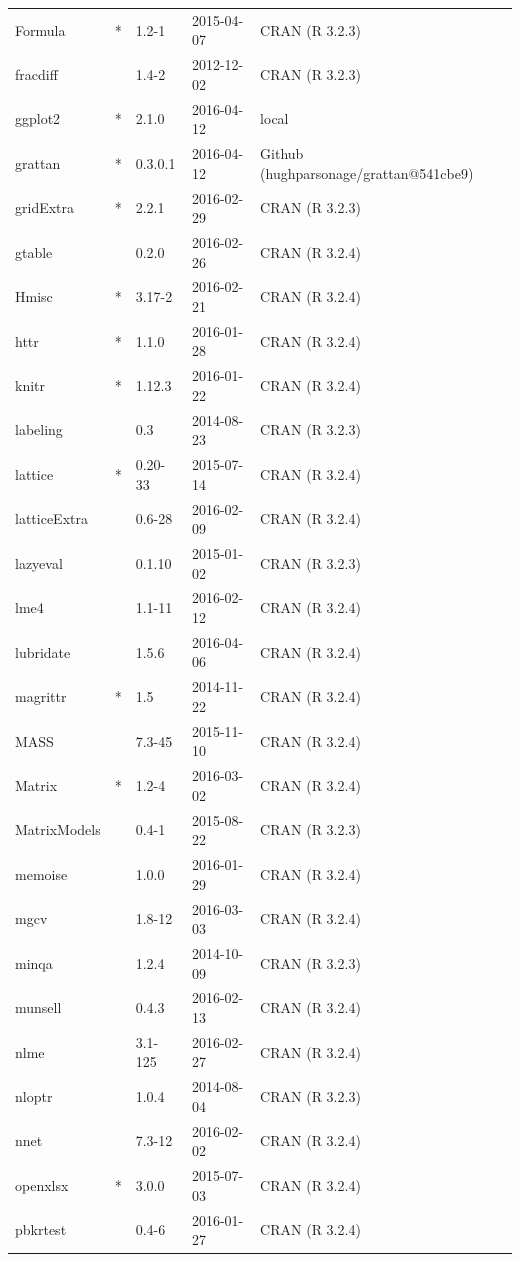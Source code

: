 \documentclass{grattan}\usepackage[]{graphicx}\usepackage[]{color}
\begin{document}
\begin{longtable}{lllll}
  Formula & * & 1.2-1 & 2015-04-07 & CRAN (R 3.2.3) \\ 
  fracdiff &  & 1.4-2 & 2012-12-02 & CRAN (R 3.2.3) \\ 
  ggplot2 & * & 2.1.0 & 2016-04-12 & local \\ 
  grattan & * & 0.3.0.1 & 2016-04-12 & Github (hughparsonage/grattan@541cbe9) \\ 
  gridExtra & * & 2.2.1 & 2016-02-29 & CRAN (R 3.2.3) \\ 
  gtable &  & 0.2.0 & 2016-02-26 & CRAN (R 3.2.4) \\ 
  Hmisc & * & 3.17-2 & 2016-02-21 & CRAN (R 3.2.4) \\ 
  httr & * & 1.1.0 & 2016-01-28 & CRAN (R 3.2.4) \\ 
  knitr & * & 1.12.3 & 2016-01-22 & CRAN (R 3.2.4) \\ 
  labeling &  & 0.3 & 2014-08-23 & CRAN (R 3.2.3) \\ 
  lattice & * & 0.20-33 & 2015-07-14 & CRAN (R 3.2.4) \\ 
  latticeExtra &  & 0.6-28 & 2016-02-09 & CRAN (R 3.2.4) \\ 
  lazyeval &  & 0.1.10 & 2015-01-02 & CRAN (R 3.2.3) \\ 
  lme4 &  & 1.1-11 & 2016-02-12 & CRAN (R 3.2.4) \\ 
  lubridate &  & 1.5.6 & 2016-04-06 & CRAN (R 3.2.4) \\ 
  magrittr & * & 1.5 & 2014-11-22 & CRAN (R 3.2.4) \\ 
  MASS &  & 7.3-45 & 2015-11-10 & CRAN (R 3.2.4) \\ 
  Matrix & * & 1.2-4 & 2016-03-02 & CRAN (R 3.2.4) \\ 
  MatrixModels &  & 0.4-1 & 2015-08-22 & CRAN (R 3.2.3) \\ 
  memoise &  & 1.0.0 & 2016-01-29 & CRAN (R 3.2.4) \\ 
  mgcv &  & 1.8-12 & 2016-03-03 & CRAN (R 3.2.4) \\ 
  minqa &  & 1.2.4 & 2014-10-09 & CRAN (R 3.2.3) \\ 
  munsell &  & 0.4.3 & 2016-02-13 & CRAN (R 3.2.4) \\ 
  nlme &  & 3.1-125 & 2016-02-27 & CRAN (R 3.2.4) \\ 
  nloptr &  & 1.0.4 & 2014-08-04 & CRAN (R 3.2.3) \\ 
  nnet &  & 7.3-12 & 2016-02-02 & CRAN (R 3.2.4) \\ 
  openxlsx & * & 3.0.0 & 2015-07-03 & CRAN (R 3.2.4) \\ 
  pbkrtest &  & 0.4-6 & 2016-01-27 & CRAN (R 3.2.4) \\ 

\end{longtable}
\end{document}
